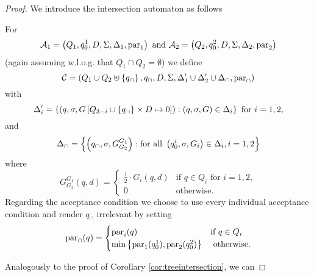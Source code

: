 \begin{proof}
  We introduce the intersection automaton as follows
  \begin{definition}
    For 
    \begin{equation*}
      \mathcal{A}_{1} = \left(
        Q_{1}, q^{1}_{0}, D, \Sigma, \Delta_{1}, \operatorname{par}_{1}\right)
      \text{ and }
      \mathcal{A}_{2} = \left(
        Q_{2}, q^{2}_{0}, D, \Sigma, \Delta_{2}, \operatorname{par}_{2}\right)
    \end{equation*}
    (again assuming w.l.o.g. that $Q_{1}\cap Q_{2} = \emptyset$) we define
    \begin{equation*}
      \mathcal{C} = \left(
        Q_{1}\cup Q_{2}\uplus\left\{q_{\cap}\right\}, q_{\cap}, D, \Sigma, 
        \Delta_{1}'\cup\Delta_{2}'\cup\Delta_{\cap}, \operatorname{par}_{\cap}
      \right)
    \end{equation*}
    with
    \begin{equation*}
      \Delta_{i}' = \left\{
        \left(q,\sigma,G\left[Q_{3-i}\cup\left\{
          q_{\cap}\right\}\times D\mapsto 0\right]\right):\left(q,\sigma, G\right)\in\Delta_{i}
      \right\}\text{ for }i = 1,2,
    \end{equation*}
    and
    \begin{equation*}
      \Delta_{\cap} = \left\{
        \left(q_{\cap},\sigma, G^{G_{1}}_{G_{2}}\right): \text{for all }
        \left(q^{i}_{0},\sigma, G_{i}\right)\in\Delta_{i}, i = 1,2
      \right\}
    \end{equation*}
    where
    \begin{equation*}
      G^{G_{1}}_{G_{2}}(q,d) = \begin{cases}
        \frac{1}{2}\cdot G_{i}(q,d)&\text{if }q\in Q_{i}\text{ for }i = 1,2,\\
        0&\text{otherwise}.
      \end{cases}
    \end{equation*}
    Regarding the acceptance condition we choose to use every individual 
    acceptance condition and render $q_{\cap}$ irrelevant by setting
    \begin{equation*}
      \operatorname{par}_{\cap}(q) = \begin{cases}
        \operatorname{par}_{i}(q)&\text{if }q\in Q_{i}\\
        \min\left\{\operatorname{par}_{1}(q_{0}^{1}),\operatorname{par}_{2}(q_{0}^{2})\right\}&\text{
          otherwise}.
      \end{cases}
    \end{equation*}
  \end{definition}
  Analogously to the proof of Corollary \ref{cor:treeintersection}, we can

\end{proof}
